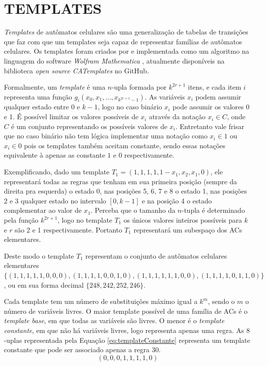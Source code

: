 \documentclass[12pt,a4paper]{article}
\let\stdsection\section
\renewcommand\section{\newpage\stdsection}
\begin{document}
\section{TEMPLATES}\label{sec:templates}
\textit{Templates} de autômatos celulares são uma generalização de tabelas de transições que faz com que um templates seja capaz de representar famílias de autômatos celulares. Os templates foram criados por  e implementada como um algoritmo na linguagem do software \textit{Wolfram Mathematica} \cite{woframMathematica10}, atualmente disponíveis na biblioteca \textit{open source CATemplates} \cite{CATemplates} no GitHub.

Formalmente, um \textit{template} é uma $n$-upla formada por $k^{2r+1}$ itens, e cada item $i$ representa uma função $g_i(x_0,x_1,\dots,x_{k^{2r+1}-1})$. As variáveis $x_i$ podem assumir qualquer estado entre 0 e $k-1$, logo no caso binário $x_i$ pode assumir os valores 0 e 1. É possível limitar os valores possíveis de $x_i$ através da notação $x_i \in C$, onde $C$ é um conjunto representando os possíveis valores de $x_i$. Entretanto vale frisar que no caso binário não tem lógica implementar uma notação como $x_i \in {1}$ ou $x_i \in {0}$ pois os templates também aceitam constante, sendo essas notações equivalente à apenas as constante $1$ e $0$ respectivamente.

Exemplificando, dado um template $T_1 = (1,1,1,1,1-x_1,x_2,x_1,0)$, ele representará todas as regras que tenham em sua primeira posição (sempre da direita pra esquerda) o estado 0, nas posições 5, 6, 7 e 8 o estado 1, nas posições 2 e 3 qualquer estado no intervalo $[0,k-1]$ e na posição 4 o estado complementar ao valor de $x_1$. Perceba que o tamanho da $n$-tupla é determinado pela função $k^{2r+1}$, logo no template $T_1$ os únicos valores inteiros possíveis para $k$ e $r$ são 2 e 1 respectivamente. Portanto $T_1$ representará um subespaço dos ACs elementares.

Deste modo o template $T_1$ representam o conjunto de autômatos celulares elementares $\{(1,1,1,1,1,0,0,0),(1,1,1,1,0,0,1,0),(1,1,1,1,1,1,0,0),(1,1,1,1,0,1,1,0)\}$, ou em sua forma decimal $\{248,242,252,246\}$.

Cada template tem um número de substituições máximo igual a $k^m$, sendo o $m$ o número de variáveis livres. O maior template possível de uma família de ACs é o \textit{template base}, em que todas as variáveis são livres. O menor é o \textit{template constante}, em que não há variáveis livres, logo representa apenas uma regra. As $8$-uplas representada pela Equação \ref{eq:templateConstante} representa um template constante que pode ser associado apenas a regra 30. 
\begin{equation}
(0,0,0,1,1,1,1,0)
\label{eq:templateConstante}
\end{equation}
\end{document}
